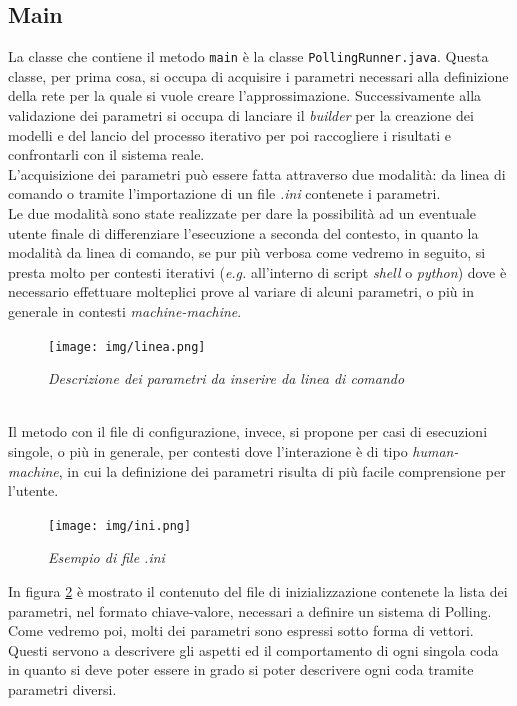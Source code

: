 \documentclass[12pt,a4paper,italian]{article}
\begin{document}
\subsection{Main}\label{cap:main}
La classe che contiene il metodo \texttt{main} è la classe \texttt{PollingRunner.java}. Questa classe, per prima cosa, si occupa di acquisire i parametri necessari alla definizione della rete per la quale si vuole creare l'approssimazione. Successivamente alla validazione dei parametri si occupa di lanciare il \emph{builder} per la creazione dei modelli e del lancio del processo iterativo per poi raccogliere i risultati e confrontarli con il sistema reale.\\
L'acquisizione dei parametri può essere fatta attraverso due modalità: da linea di comando o tramite l'importazione di un file \emph{.ini} contenete i parametri.\\ Le due modalità sono state realizzate per dare la possibilità ad un eventuale utente finale di differenziare l'esecuzione a seconda del contesto, in quanto la modalità da linea di comando, se pur più verbosa come vedremo in seguito, si presta molto per contesti iterativi  (\emph{e.g.} all'interno di script \emph{shell} o \emph{python}) dove è necessario effettuare molteplici prove al variare di alcuni parametri, o più in generale in contesti \emph{machine-machine}.\\
\begin{figure}[ht!]
	\centering
	\texttt{[image: img/linea.png]}
	\caption{\emph{Descrizione dei parametri da inserire da linea di comando}}\label{linea}
\end{figure}\\
Il metodo con il file di configurazione, invece, si propone per casi di esecuzioni singole, o più in generale, per contesti dove l'interazione è di tipo \emph{human-machine}, in cui la definizione dei parametri risulta di più facile comprensione per l'utente.
\begin{figure}[ht!]
	\centering
	\texttt{[image: img/ini.png]}
	\caption{\emph{Esempio di file .ini}}\label{ini}
\end{figure}
In figura \ref{ini} è mostrato il contenuto del file di inizializzazione contenete la lista dei parametri, nel formato chiave-valore, necessari a definire un sistema di Polling. Come vedremo poi, molti dei parametri sono espressi sotto forma di vettori. Questi servono a descrivere gli aspetti ed il comportamento di ogni singola coda in quanto si deve poter essere in grado si poter descrivere ogni coda tramite parametri diversi.\\
\end{document}
